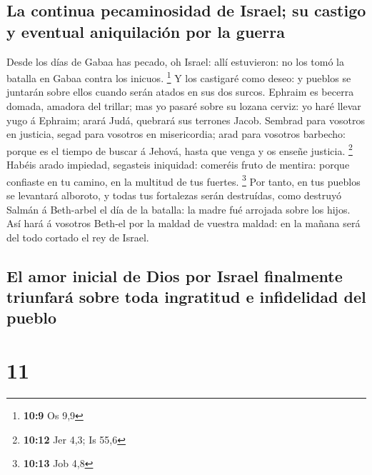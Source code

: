 \hypertarget{la-continua-pecaminosidad-de-israel-su-castigo-y-eventual-aniquilaciuxf3n-por-la-guerra}{%
\subsection{La continua pecaminosidad de Israel; su castigo y eventual
aniquilación por la
guerra}\label{la-continua-pecaminosidad-de-israel-su-castigo-y-eventual-aniquilaciuxf3n-por-la-guerra}}

 Desde los días de Gabaa has pecado, oh Israel: allí
estuvieron: no los tomó la batalla en Gabaa contra los inicuos.
\footnote{\textbf{10:9} Os 9,9}  Y los castigaré como
deseo: y pueblos se juntarán sobre ellos cuando serán atados en sus dos
surcos.  Ephraim es becerra domada, amadora del trillar;
mas yo pasaré sobre su lozana cerviz: yo haré llevar yugo á Ephraim;
arará Judá, quebrará sus terrones Jacob.  Sembrad para
vosotros en justicia, segad para vosotros en misericordia; arad para
vosotros barbecho: porque es el tiempo de buscar á Jehová, hasta que
venga y os enseñe justicia. \footnote{\textbf{10:12} Jer 4,3; Is 55,6}
 Habéis arado impiedad, segasteis iniquidad: comeréis fruto
de mentira: porque confiaste en tu camino, en la multitud de tus
fuertes. \footnote{\textbf{10:13} Job 4,8}  Por tanto, en
tus pueblos se levantará alboroto, y todas tus fortalezas serán
destruídas, como destruyó Salmán á Beth-arbel el día de la batalla: la
madre fué arrojada sobre los hijos.  Así hará á vosotros
Beth-el por la maldad de vuestra maldad: en la mañana será del todo
cortado el rey de Israel.

\hypertarget{el-amor-inicial-de-dios-por-israel-finalmente-triunfaruxe1-sobre-toda-ingratitud-e-infidelidad-del-pueblo}{%
\subsection{El amor inicial de Dios por Israel finalmente triunfará
sobre toda ingratitud e infidelidad del
pueblo}\label{el-amor-inicial-de-dios-por-israel-finalmente-triunfaruxe1-sobre-toda-ingratitud-e-infidelidad-del-pueblo}}

\hypertarget{section-10}{%
\section{11}\label{section-10}}

